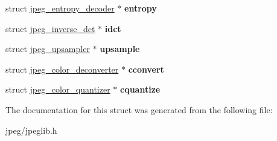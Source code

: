 \begin{DoxyCompactItemize}
\item 
struct \hyperlink{structjpeg__entropy__decoder}{jpeg\+\_\+entropy\+\_\+decoder} $\ast$ {\bfseries entropy}\hypertarget{structjpeg__decompress__struct_ac53f055b3d8103caa6c7ba4b4975eb5b}{}\label{structjpeg__decompress__struct_ac53f055b3d8103caa6c7ba4b4975eb5b}

\item 
struct \hyperlink{structjpeg__inverse__dct}{jpeg\+\_\+inverse\+\_\+dct} $\ast$ {\bfseries idct}\hypertarget{structjpeg__decompress__struct_a2ef67a2829f8ecebb1af0ed440bff8bf}{}\label{structjpeg__decompress__struct_a2ef67a2829f8ecebb1af0ed440bff8bf}

\item 
struct \hyperlink{structjpeg__upsampler}{jpeg\+\_\+upsampler} $\ast$ {\bfseries upsample}\hypertarget{structjpeg__decompress__struct_a80ad7e1c14488a065697b09679479c5d}{}\label{structjpeg__decompress__struct_a80ad7e1c14488a065697b09679479c5d}

\item 
struct \hyperlink{structjpeg__color__deconverter}{jpeg\+\_\+color\+\_\+deconverter} $\ast$ {\bfseries cconvert}\hypertarget{structjpeg__decompress__struct_a1f88347e58f8f9d93954aa885f3497fb}{}\label{structjpeg__decompress__struct_a1f88347e58f8f9d93954aa885f3497fb}

\item 
struct \hyperlink{structjpeg__color__quantizer}{jpeg\+\_\+color\+\_\+quantizer} $\ast$ {\bfseries cquantize}\hypertarget{structjpeg__decompress__struct_ace3f4f51b8cf7bd24428ae9d10f5ddf1}{}\label{structjpeg__decompress__struct_ace3f4f51b8cf7bd24428ae9d10f5ddf1}

\end{DoxyCompactItemize}


The documentation for this struct was generated from the following file\+:\begin{DoxyCompactItemize}
\item 
jpeg/jpeglib.\+h\end{DoxyCompactItemize}
